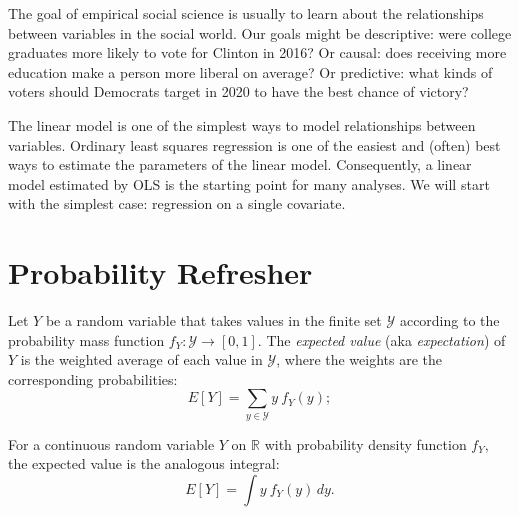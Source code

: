 \documentclass[
  12pt,
  oneside,openany]{book}
\begin{document}
\providecommand{\SSE}{\mathop{\rm SSE}\nolimits}
\providecommand{\RSS}{\mathop{\rm RSS}\nolimits}
\providecommand{\TSS}{\mathop{\rm TSS}\nolimits}
\providecommand{\Cov}{\mathop{\rm Cov}\nolimits}
\providecommand{\pderiv}[2]{\frac{\partial{}#1}{\partial{}#2}}

The goal of empirical social science is usually to learn about the relationships between variables in the social world. Our goals might be descriptive: were college graduates more likely to vote for Clinton in 2016? Or causal: does receiving more education make a person more liberal on average? Or predictive: what kinds of voters should Democrats target in 2020 to have the best chance of victory?

The linear model is one of the simplest ways to model relationships between variables. Ordinary least squares regression is one of the easiest and (often) best ways to estimate the parameters of the linear model. Consequently, a linear model estimated by OLS is the starting point for many analyses. We will start with the simplest case: regression on a single covariate.

\hypertarget{probability}{%
\section{Probability Refresher}\label{probability}}

Let \(Y\) be a random variable that takes values in the finite set \(\mathcal{Y}\) according to the probability mass function \(f_Y : \mathcal{Y} \to [0, 1]\). The \emph{expected value} (aka \emph{expectation}) of \(Y\) is the weighted average of each value in \(\mathcal{Y}\), where the weights are the corresponding probabilities:
\begin{equation}
E[Y] = \sum_{y \in \mathcal{Y}} y \: f_Y(y);
\end{equation}

For a continuous random variable \(Y\) on \(\mathbb{R}\) with probability density function \(f_Y\), the expected value is the analogous integral:
\begin{equation}
E[Y] = \int y \: f_Y(y) \, dy.
\end{equation}
\end{document}
